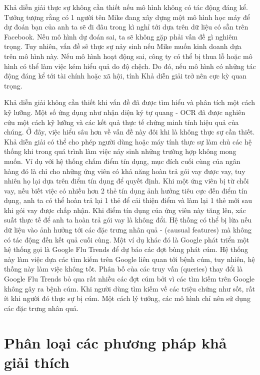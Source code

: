 Khả diễn giải thực sự không cần thiết nếu mô hình không có tác động đáng kể. Tưởng tượng rằng có 1 người tên Mike đang xây dựng một mô hình học máy để dự đoán bạn của anh ta sẽ đi đâu trong kì nghỉ tới dựa trên dữ liệu có sẵn trên Facebook. Nếu mô hình dự đoán sai, ta sẽ không gặp phải vấn đề gì nghiêm trọng. Tuy nhiên, vấn đề sẽ thực sự nảy sinh nếu Mike muốn kinh doanh dựa trên mô hình này. Nếu mô hình hoạt động sai, công ty có thể bị thua lỗ hoặc mô hình có thể làm việc kém hiểu quả do độ chệch. Do đó, nếu mô hình có những tác động đáng kể tới tài chính hoặc xã hội, tính Khả diễn giải trở nên cực kỳ quan trọng.

Khả diễn giải không cần thiết khi vấn đề đã được tìm hiểu và phân tích một cách kỹ lưỡng. Một số ứng dụng như nhận diện ký tự quang - OCR đã được nghiên cứu một cách kỹ lưỡng và các kết quả thực tế chứng minh tính hiệu quả của chúng. Ở đây, việc hiểu sâu hơn về vấn đề này đôi khi là không thực sự cần thiết.
Khả diễn giải có thể cho phép người dùng hoặc máy tính thực sự làm chủ các hệ thống khi trong quá trình làm việc nảy sinh những trường hợp không mong muốn.  Ví dụ với hệ thống chấm điểm tín dụng, mục đích cuối cùng của ngân hàng đó là chỉ cho những ứng viên có khả năng hoàn trả gói vay được vay, tuy nhiên họ lại dựa trên điểm tín dụng để quyết định. Khi một ứng viên bị từ chối vay, nếu biết việc có nhiều hơn 2 thẻ tín dụng ảnh hưởng tiêu cực đến điểm tín dụng, anh ta có thể hoàn trả lại 1 thẻ để cải thiện điểm và làm lại 1 thẻ mới sau khi gói vay được chấp nhận. Khi điểm tín dụng của ứng viên này tăng lên, xác suất thực tế để anh ta hoàn trả gói vay là không đổi. Hệ thống có thể bị lừa nếu dữ liệu vào ảnh hưởng tới các đặc trưng nhân quả - (causual features) mà không có tác động đến kết quả cuối cùng. Một ví dụ khác đó là Google phát triển một hệ thống gọi là Google Flu Trends để dự báo các đợt bùng phát cúm. Hệ thống này làm việc dựa các tìm kiếm trên Google liên quan tới bệnh cúm, tuy nhiên, hệ thống này làm việc không tốt. Phân bố của các truy vấn (queries) thay đổi là Google Flu Trends bỏ qua rất nhiều các đợt cúm bởi vì các tìm kiếm trên Google không gây ra bệnh cúm. Khi người dùng tìm kiếm về các triệu chứng như sốt, rất ít khi người đó thực sự bị cúm. Một cách lý tưởng, các mô hình chỉ nên sử dụng các đặc trưng nhân quả.

\clearpage

\section{Phân loại các phương pháp khả giải thích}

